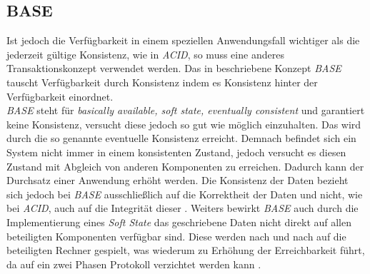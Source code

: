 \subsection{BASE}\label{sec:transactionTheory:base}
Ist jedoch die Verfügbarkeit in einem speziellen Anwendungsfall wichtiger als die jederzeit gültige Konsistenz, wie in \textit{ACID}, so muss eine anderes Transaktionskonzept verwendet werden. Das in \cite{PritchettBASE} beschriebene Konzept \textit{BASE} tauscht Verfügbarkeit durch Konsistenz indem es Konsistenz hinter der Verfügbarkeit einordnet. \\
\textit{BASE} steht für \textit{basically available, soft state, eventually consistent} und garantiert keine Konsistenz, versucht diese jedoch so gut wie möglich einzuhalten. Das wird durch die so genannte eventuelle Konsistenz erreicht. Demnach befindet sich ein System nicht immer in einem konsistenten Zustand, jedoch versucht es diesen Zustand mit Abgleich von anderen Komponenten zu erreichen. Dadurch kann der Durchsatz einer Anwendung erhöht werden. Die Konsistenz der Daten bezieht sich jedoch bei \textit{BASE} ausschließlich auf die Korrektheit der Daten und nicht, wie bei \textit{ACID}, auch auf die Integrität dieser \citep{EdlichFriedlandHampeBrauer201010}. Weiters bewirkt \textit{BASE} auch durch die Implementierung eines \textit{Soft State} das geschriebene Daten nicht direkt auf allen beteiligten Komponenten verfügbar sind. Diese werden nach und nach auf die beteiligten Rechner gespielt, was wiederum zu Erhöhung der Erreichbarkeit führt, da auf ein zwei Phasen Protokoll verzichtet werden kann \citep{EdlichFriedlandHampeBrauer201010}.

